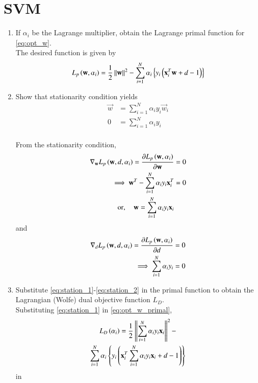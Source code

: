 \documentclass[journal,12pt,twocolumn]{IEEEtran}
\renewcommand\thesection{\arabic{section}}
\begin{document}
\section{SVM}
\begin{enumerate}[label=\thesection.\arabic*,ref=\thesection.\theenumi]

\item If $\alpha_i$  be the Lagrange multiplier, obtain the Lagrange primal function for \eqref{eq:opt_w}.
\\
\solution The desired function is given by 
\begin{align}
\label{eq:opt_w_primal}
L_p\left(\mathbf{w},\alpha_i\right)= \frac{1}{2}\left\Vert\mathbf{w}\right\Vert^2 - 
\sum_{i=1}^{N}\alpha_i\left\{y_i\left(\mathbf{x}_i^T\mathbf{w}+d -1\right)\right\}
\end{align}

\item  Show that stationarity condition yields
%
\begin{align}
\label{eq:station_1}
\vec{w} &= \sum_{i=1}^{N}\alpha_iy_i \vec{w}_i
\\
0 &= \sum_{i=1}^{N}\alpha_iy_i 
\label{eq:station_2}
\end{align}
\\
\solution From the stationarity condition, 
\begin{align}
\nabla_\mathbf{w} L_p\left(\mathbf{w},d,\alpha_i\right)
=\frac{\partial L_p\left(\mathbf{w},\alpha_i\right)}{\partial \mathbf{w}} &= 0
\\
\implies \mathbf{w}^T -  \sum_{i=1}^{N}\alpha_iy_i \mathbf{x}_i^T &= 0
\\
\text{or}, \quad \mathbf{w} =  \sum_{i=1}^{N}\alpha_iy_i \mathbf{x}_i&
\end{align}
and 
\begin{align}
\nabla_d L_p\left(\mathbf{w},d,\alpha_i\right)
=\frac{\partial L_p\left(\mathbf{w},\alpha_i\right)}{\partial d} &= 0
\\
\implies \sum_{i=1}^{N}\alpha_iy_i &= 0
\end{align}


\item Substitute \eqref{eq:station_1}-\eqref{eq:station_2} in the primal function to obtain the Lagrangian 
(Wolfe) dual objective function $L_D$.  
\\
\solution Substituting \eqref{eq:station_1} in \eqref{eq:opt_w_primal},
\begin{multline}
L_D\left(\alpha_i\right)= \frac{1}{2}\left\Vert\sum_{i=1}^{N}\alpha_iy_i \mathbf{x}_i\right\Vert^2 - 
\\
\sum_{i=1}^{N}\alpha_i\left\{y_i\left(\mathbf{x}_i^T\sum_{i=1}^{N}\alpha_iy_i \mathbf{x}_i+d -1\right)\right\}
\end{multline}
 in 


\end{enumerate}
\end{document}
